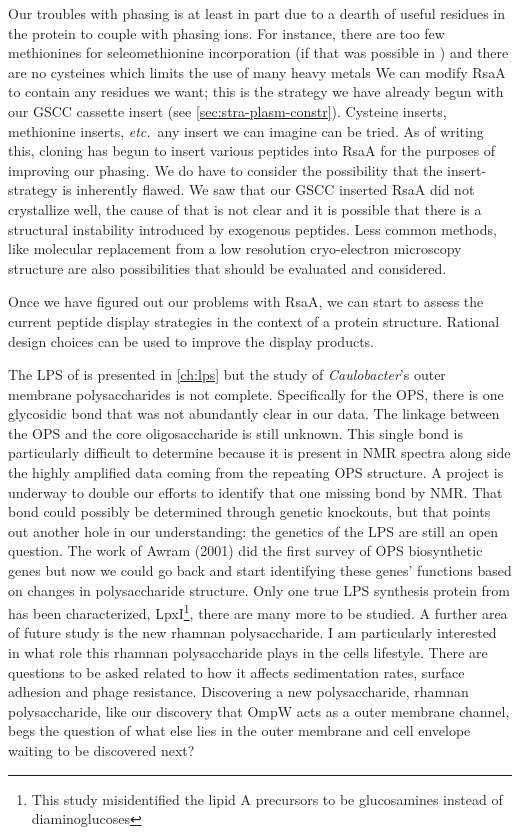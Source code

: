 Our troubles with phasing is at least in part due to a dearth of useful residues in the protein to couple with phasing ions. For instance, there are too few methionines for seleomethionine incorporation (if that was possible in \caulobacter{}) and there are no cysteines which limits the use of many heavy metals We can modify RsaA to contain any residues we want; this is the strategy we have already begun with our GSCC cassette insert (see \cref{sec:stra-plasm-constr}). Cysteine inserts, methionine inserts, \textit{etc.}~any insert we can imagine can be tried. As of writing this, cloning has begun to insert various peptides into RsaA for the purposes of improving our phasing. We do have to consider the possibility that the insert-strategy is inherently flawed. We saw that our GSCC inserted RsaA did not crystallize well, the cause of that is not clear and it is possible that there is a structural instability introduced by exogenous peptides. Less common methods, like molecular replacement from a low resolution cryo-electron microscopy structure are also possibilities that should be evaluated and considered. 

Once we have figured out our problems with RsaA, we can start to assess the current peptide display strategies in the context of a protein  structure. Rational design choices can be used to improve the display products. 

The \ac{LPS} of \caulobacter{} is presented in \cref{ch:lps} but the study of \textit{Caulobacter}'s outer membrane polysaccharides is not complete. Specifically for the \ac{OPS}, there is one glycosidic bond that was not abundantly clear in our data. The linkage between the \ac{OPS} and the core oligosaccharide is still unknown. This  single bond is particularly difficult to determine because it is present in \ac{NMR} spectra along side the highly amplified data coming from the repeating \ac{OPS} structure. A project is underway to double our efforts to identify that one missing bond by \ac{NMR}. That bond could possibly  be determined through genetic knockouts, but that points out another hole in our understanding: the genetics of the \caulobacter{} \ac{LPS} are still an open question. The work of Awram \etal{} (2001) did the first survey of \ac{OPS} biosynthetic genes but now we could go back and start identifying these genes' functions based on changes in polysaccharide structure. Only one true \ac{LPS} synthesis protein from \caulobacter{} has been characterized, LpxI\footnote{This study misidentified the lipid A precursors to be glucosamines instead of diaminoglucoses}, there are many more to be studied. A further area of future study is the new rhamnan polysaccharide. I am particularly interested in what role this rhamnan polysaccharide plays in the cells lifestyle. There are questions to be asked related to how it affects sedimentation rates, surface adhesion and phage resistance. Discovering a new polysaccharide, rhamnan polysaccharide, like our discovery that OmpW acts as a outer membrane channel, begs the question of what else lies in the outer membrane and cell envelope waiting to be discovered next?
